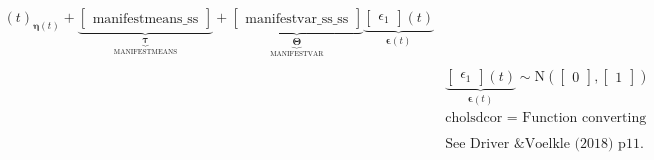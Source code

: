 \documentclass[a4paper,landscape]{report}
\newcommand{\vect}[1]{\boldsymbol{\mathbf{#1}}}
\begin{document}
\begin{footnotesize}
\begin{align*}
{          (t)}_{\vect{\eta}(t)} +
        \underbrace{
          \begin{bmatrix}
\text{manifestmeans\_ss}
\end{bmatrix} 
        }_{\underbrace{\vect{\tau}}_\textrm{MANIFESTMEANS}} + 
              \underbrace{
                \begin{bmatrix}
\text{manifestvar\_ss\_ss}
\end{bmatrix}  
              }_{\underbrace{\vect{\Theta}}_\textrm{MANIFESTVAR}}
              \underbrace{
          \begin{bmatrix}
\epsilon_{1}
\end{bmatrix} 
          (t)}_{\vect{\epsilon}(t)} \\ \\
          &\underbrace{
            \begin{bmatrix}
\epsilon_{1}
\end{bmatrix} 
            (t)}_{\vect{\epsilon}(t)} \sim  \mathrm{N} \left(
              \begin{bmatrix}
0
\end{bmatrix}
              ,
                \begin{bmatrix}
1
\end{bmatrix} \right) \\
&\textrm{cholsdcor = Function converting lower tri matrix of std dev and unconstrained correlation to Cholesky factor.} \\ \\ 
&\textrm{See Driver \& Voelkle (2018) p11.}
      \end{align*}
      \end{footnotesize}
      
\end{document}

